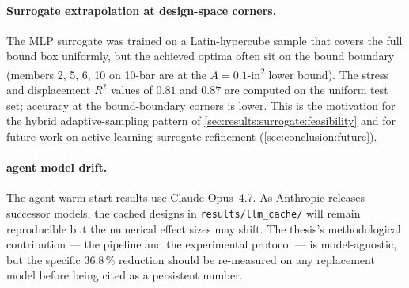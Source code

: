 \paragraph{Surrogate extrapolation at design-space corners.} The
MLP surrogate was trained on a Latin-hypercube sample that
covers the full bound box uniformly, but the achieved optima
often sit on the bound boundary (members 2, 5, 6, 10 on 10-bar
are at the $A=\num{0.1}$-in\textsuperscript{2} lower bound).
The stress and displacement $R^2$ values of $\num{0.81}$ and
$\num{0.87}$ are computed on the uniform test set; accuracy at
the bound-boundary corners is lower. This is the motivation for
the hybrid adaptive-sampling pattern of
\cref{sec:results:surrogate:feasibility} and for future work on
active-learning surrogate refinement
(\cref{sec:conclusion:future}).

\paragraph{agent model drift.} The agent warm-start results use
Claude Opus~4.7. As Anthropic releases successor models, the
cached designs in \texttt{results/llm\_cache/} will remain
reproducible but the numerical effect sizes may shift. The
thesis's methodological contribution --- the pipeline and the
experimental protocol --- is model-agnostic, but the specific
$\num{36.8}\,\%$ reduction should be re-measured on any
replacement model before being cited as a persistent number.
